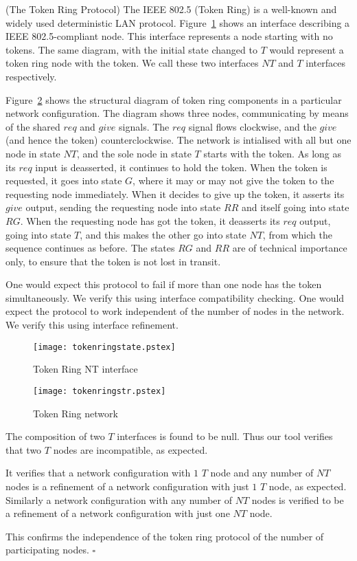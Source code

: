 \begin{examp}{(The Token Ring Protocol)}
The IEEE 802.5 (Token Ring) is a well-known and widely used deterministic 
LAN protocol. Figure~\ref{tokenringstate} shows an interface describing a 
IEEE 802.5-compliant node. This interface represents a node starting with
no tokens. The same diagram, with the initial state changed to $T$ would 
represent a token ring node with the token. We call these two interfaces
$NT$ and $T$ interfaces respectively.

Figure~\ref{tokenringstr} shows the structural diagram of token ring
components in a particular network configuration. The diagram shows three
nodes, communicating by means of the shared $req$ and $give$ signals. The
$req$ signal flows clockwise, and the $give$ (and hence the token) 
counterclockwise. The network is intialised with all but one node in 
state $NT$, and the sole node in state $T$ starts with the token. As long
as its $req$ input is deasserted, it continues to hold the token. When 
the token is requested, it goes into state $G$, where it may or may not 
give the token to the requesting node immediately. When it decides to 
give up the token, it asserts its $give$ output, sending the requesting 
node into state $RR$ and itself going into state $RG$. When the 
requesting node has got the token, it deasserts its $req$ output, going 
into state $T$, and this makes the other go into state $NT$, from which
the sequence continues as before. The states $RG$ and $RR$ are of
technical importance only, to ensure that the token is not lost in transit.

One would expect this protocol to fail if more than one node has the token 
simultaneously. We verify this using interface compatibility checking.
One would expect the protocol to work independent of the number of nodes
in the network. We verify this using interface refinement.

\begin{figure}[htb]
\centering
\texttt{[image: tokenringstate.pstex]}
\caption{Token Ring NT interface} \label{tokenringstate}
\end{figure}

\begin{figure}[htb]
\centering
\texttt{[image: tokenringstr.pstex]}
\caption{Token Ring network} \label{tokenringstr}
\end{figure}

The composition of two $T$ interfaces is found to be null. Thus our tool 
verifies that two $T$ nodes are incompatible, as expected.

It verifies that a network configuration with $1$ $T$ node and any number 
of $NT$ nodes is a refinement of a network configuration with just 
$1$ $T$ node, as expected.  
Similarly a network configuration with any number of $NT$ nodes is
verified to be a refinement of a network configuration with just
one $NT$ node.

This confirms the independence of the token ring protocol of the number
of participating nodes. $\square$
\end{examp}
